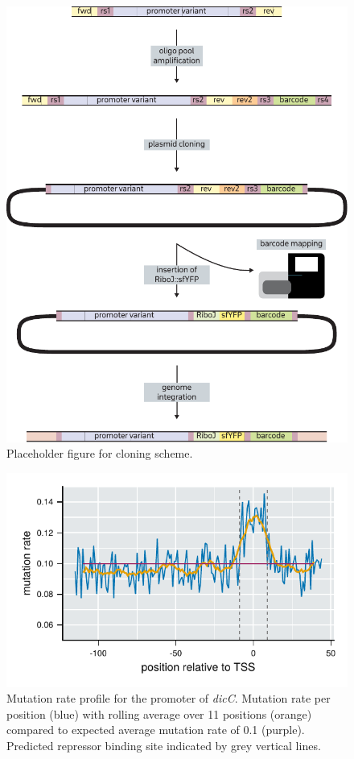 \begin{figure}[H]
    \centering
    \includegraphics{../figures/cloning_scheme.pdf}
    \caption{Placeholder figure for cloning scheme.}
    \label{fig:cloning}
\end{figure}

\begin{figure}[H]
    \centering
    \includegraphics[scale=1]{../figures/dicCp_mutation_rate_oligos.pdf}
    \caption{Mutation rate profile for the promoter of \textit{dicC}. Mutation rate per position (blue) with rolling average over 11 positions (orange) compared to expected average mutation rate of 0.1 (purple). Predicted repressor binding site indicated by grey vertical lines.}
    \label{fig:dicCp}
\end{figure}


